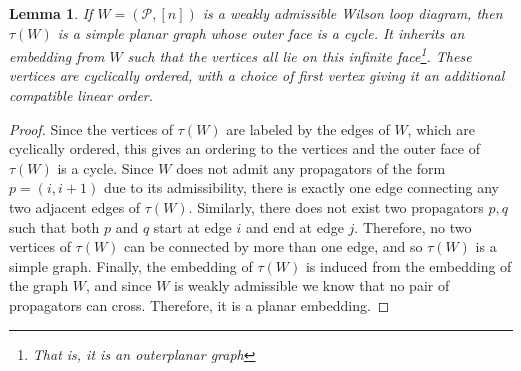 \documentclass[11pt]{article}
\newcommand{\cP}{\mathcal{P}}
\newtheorem{lem}[thm]{Lemma}
\theoremstyle{remark}
\theoremstyle{definition}
\begin{document}
\begin{lem}\label{tausimpleplanarlem}
If $W = (\cP, [n])$ is a weakly admissible Wilson loop diagram, then $\tau(W)$ is a simple planar graph whose outer face is a cycle. It inherits an embedding from $W$ such that the vertices all lie on this infinite face\footnote{That is, it is an \emph{outerplanar} graph}. These vertices are cyclically ordered, with a choice of first vertex giving it an additional compatible linear order.
\end{lem}

\begin{proof}
Since the vertices of $\tau(W)$ are labeled by the edges of $W$, which are cyclically ordered, this gives an ordering to the vertices and the outer face of $\tau(W)$ is a cycle.  Since $W$ does not admit any propagators of the form $p = (i, i+1)$ due to its admissibility, there is exactly one edge connecting any two adjacent edges of $\tau(W)$. Similarly, there does not exist two propagators $p,q$ such that both $p$ and $q$ start at edge $i$ and end at edge $j$. Therefore, no two vertices of $\tau(W)$ can be connected by more than one edge, and so $\tau(W)$ is a simple graph. Finally, the embedding of $\tau(W)$ is induced from the embedding of the graph $W$, and since $W$ is weakly admissible we know that no pair of propagators can cross. Therefore, it is a planar embedding. 
 \end{proof}
\end{document}
